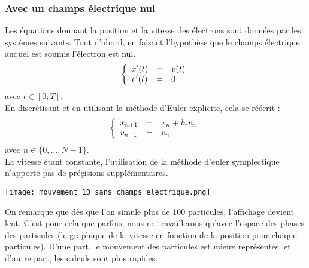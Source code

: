 \documentclass{article}
\begin{document}
\subsubsection{Avec un champs électrique nul}
Les équations donnant la position et la vitesse des électrons sont données par les systèmes suivants. Tout d'abord, en faisant l'hypothèse que le champs électrique auquel est soumis l'électron est nul.
$$
\left \{
   \begin{array}{l l l}
      x'(t)  & = & v(t) \\
      v'(t)  & = & 0 \\
	\end{array}
\right.
$$
avec $t \in [0;T]$.\\
En discrétisant et en utilisant la méthode d'Euler explicite, cela se réécrit :
$$
\left \{
   \begin{array}{l l l}
      x_{n+1}  & = & x_n + h.v_n \\
      v_{n+1}  & = & v_n \\
	\end{array}
\right.
$$
avec $n \in \{0,...,N-1\}$.\\
La vitesse étant constante, l'utilisation de la méthode d'euler symplectique n'apporte pas de préçisions supplémentaires.\\
\begin{center}
\texttt{[image: mouvement\_1D\_sans\_champs\_electrique.png]}
\end{center}
On remarque que dès que l'on simule plus de 100 particules, l'affichage devient lent. C'est pour cela que parfois, nous ne travaillerons qu'avec l'espace des phases des particules (le graphique de la vitesse en fonction de la position pour chaque particules). D'une part, le mouvement des particules est mieux représentés, et d'autre part, les calculs sont plus rapides.
\end{document}
